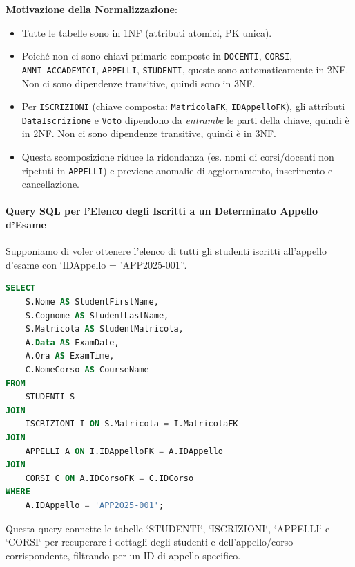 \textbf{Motivazione della Normalizzazione}:
\begin{itemize}
    \item Tutte le tabelle sono in 1NF (attributi atomici, PK unica).
    \item Poiché non ci sono chiavi primarie composte in \lstinline{DOCENTI}, \lstinline{CORSI}, \lstinline{ANNI_ACCADEMICI}, \lstinline{APPELLI}, \lstinline{STUDENTI}, queste sono automaticamente in 2NF. Non ci sono dipendenze transitive, quindi sono in 3NF.
    \item Per \lstinline{ISCRIZIONI} (chiave composta: \lstinline{MatricolaFK}, \lstinline{IDAppelloFK}), gli attributi \lstinline{DataIscrizione} e \lstinline{Voto} dipendono da \textit{entrambe} le parti della chiave, quindi è in 2NF. Non ci sono dipendenze transitive, quindi è in 3NF.
    \item Questa scomposizione riduce la ridondanza (es. nomi di corsi/docenti non ripetuti in \lstinline{APPELLI}) e previene anomalie di aggiornamento, inserimento e cancellazione.
\end{itemize}

\paragraph{Query SQL per l'Elenco degli Iscritti a un Determinato Appello d'Esame}
Supponiamo di voler ottenere l'elenco di tutti gli studenti iscritti all'appello d'esame con `IDAppello = 'APP2025-001'`.

\begin{lstlisting}[language=SQL, caption={Query per l'elenco degli iscritti a un appello d'esame specifico}]
SELECT
    S.Nome AS StudentFirstName,
    S.Cognome AS StudentLastName,
    S.Matricola AS StudentMatricola,
    A.Data AS ExamDate,
    A.Ora AS ExamTime,
    C.NomeCorso AS CourseName
FROM
    STUDENTI S
JOIN
    ISCRIZIONI I ON S.Matricola = I.MatricolaFK
JOIN
    APPELLI A ON I.IDAppelloFK = A.IDAppello
JOIN
    CORSI C ON A.IDCorsoFK = C.IDCorso
WHERE
    A.IDAppello = 'APP2025-001';
\end{lstlisting}
Questa query connette le tabelle `STUDENTI`, `ISCRIZIONI`, `APPELLI` e `CORSI` per recuperare i dettagli degli studenti e dell'appello/corso corrispondente, filtrando per un ID di appello specifico.